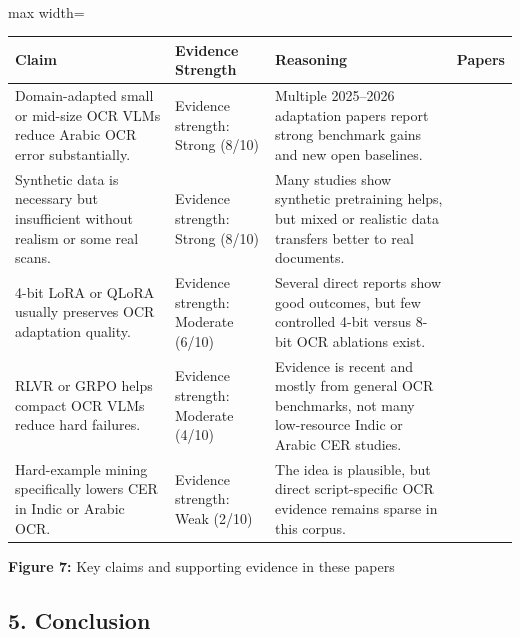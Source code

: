     
    \mbox{}\\
    \begin{adjustbox}{max width=\textwidth}
    \begin{tabular}{p{4.0cm} | p{4.0cm} | p{4.0cm} | p{4.0cm}}
    \hline
    Claim & Evidence Strength & Reasoning & Papers \\
    \hline
    Domain-adapted small or mid-size OCR VLMs reduce Arabic OCR error substantially. & Evidence strength: Strong (8/10) & Multiple 2025–2026 adaptation papers report strong benchmark gains and new open baselines. & \cite{Wasfy2025QARI-OCR:} \cite{Elkousy2026Domain-Specific} \cite{Hennara2025Baseer:} \cite{Momayiz2026AtlasOCR:} \\
    Synthetic data is necessary but insufficient without realism or some real scans. & Evidence strength: Strong (8/10) & Many studies show synthetic pretraining helps, but mixed or realistic data transfers better to real documents. & \cite{Chung2025Finetuning} \cite{Singh2026Can} \cite{Alhomoud2025Cross-Lingual} \cite{Gunda2026CURIO:} \\
    4-bit LoRA or QLoRA usually preserves OCR adaptation quality. & Evidence strength: Moderate (6/10) & Several direct reports show good outcomes, but few controlled 4-bit versus 8-bit OCR ablations exist. & \cite{Wasfy2025QARI-OCR:} \cite{Elkousy2026Domain-Specific} \cite{Momayiz2026AtlasOCR:} \\
    RLVR or GRPO helps compact OCR VLMs reduce hard failures. & Evidence strength: Moderate (4/10) & Evidence is recent and mostly from general OCR benchmarks, not many low-resource Indic or Arabic CER studies. & \cite{Taghadouini2026LightOnOCR:} \cite{Xu2026Multilingual} \\
    Hard-example mining specifically lowers CER in Indic or Arabic OCR. & Evidence strength: Weak (2/10) & The idea is plausible, but direct script-specific OCR evidence remains sparse in this corpus. & \cite{Taghadouini2026LightOnOCR:} \cite{Li2026HunyuanOCR-1.5:} \\
    \hline
    \end{tabular}
    \end{adjustbox}
    
    
    \textbf{Figure 7:} Key claims and supporting evidence in these papers
    
    
    \subsection*{5. Conclusion}
    
